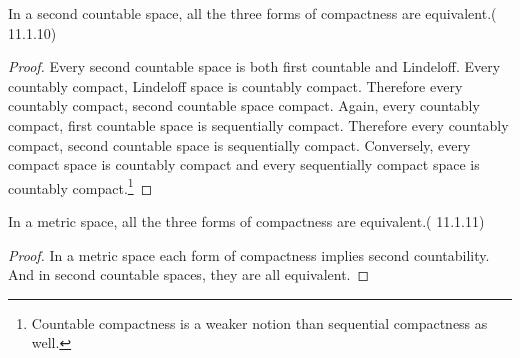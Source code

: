 \begin{theorem}
	In a second countable space, all the three forms of compactness are equivalent.(\cite{joshi} 11.1.10)
\end{theorem}
\begin{proof}
	Every second countable space is both first countable and Lindeloff. Every countably compact, Lindeloff space is countably compact. Therefore every countably compact, second countable space compact. Again, every countably compact, first countable space is sequentially compact. Therefore every countably compact, second countable space is sequentially compact. Conversely, every compact space is countably compact and every sequentially compact space is countably compact.\footnote{Countable compactness is a weaker notion than sequential compactness as well.}
\end{proof}

\begin{theorem}
	In a metric space, all the three forms of compactness are equivalent.(\cite{joshi} 11.1.11)
\end{theorem}
\begin{proof}
	In a metric space each form of compactness implies second countability. And in second countable spaces, they are all equivalent.
\end{proof}




